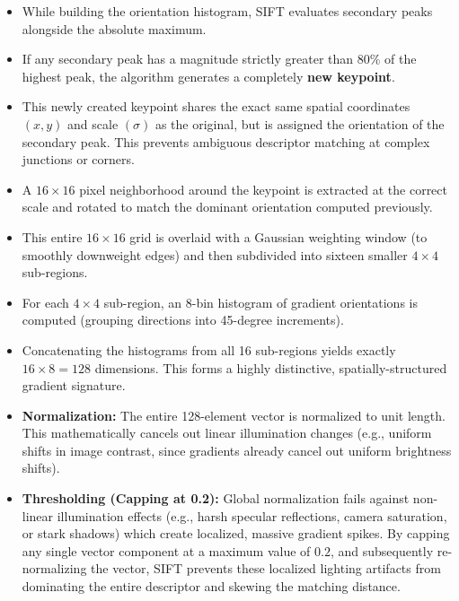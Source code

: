 {
\begin{itemize}
    \item While building the orientation histogram, SIFT evaluates secondary peaks alongside the absolute maximum.
    \item If any secondary peak has a magnitude strictly greater than $80\%$ of the highest peak, the algorithm generates a completely \textbf{new keypoint}.
    \item This newly created keypoint shares the exact same spatial coordinates $(x, y)$ and scale $(\sigma)$ as the original, but is assigned the orientation of the secondary peak. This prevents ambiguous descriptor matching at complex junctions or corners.
\end{itemize}
}

{
\begin{itemize}
    \item A $16 \times 16$ pixel neighborhood around the keypoint is extracted at the correct scale and rotated to match the dominant orientation computed previously.
    \item This entire $16 \times 16$ grid is overlaid with a Gaussian weighting window (to smoothly downweight edges) and then subdivided into sixteen smaller $4 \times 4$ sub-regions.
    \item For each $4 \times 4$ sub-region, an 8-bin histogram of gradient orientations is computed (grouping directions into 45-degree increments).
    \item Concatenating the histograms from all 16 sub-regions yields exactly $16 \times 8 = 128$ dimensions. This forms a highly distinctive, spatially-structured gradient signature.
\end{itemize}
}

{
\begin{itemize}
    \item \textbf{Normalization:} The entire 128-element vector is normalized to unit length. This mathematically cancels out linear illumination changes (e.g., uniform shifts in image contrast, since gradients already cancel out uniform brightness shifts).
    \item \textbf{Thresholding (Capping at 0.2):} Global normalization fails against non-linear illumination effects (e.g., harsh specular reflections, camera saturation, or stark shadows) which create localized, massive gradient spikes. By capping any single vector component at a maximum value of $0.2$, and subsequently re-normalizing the vector, SIFT prevents these localized lighting artifacts from dominating the entire descriptor and skewing the matching distance.
\end{itemize}
}